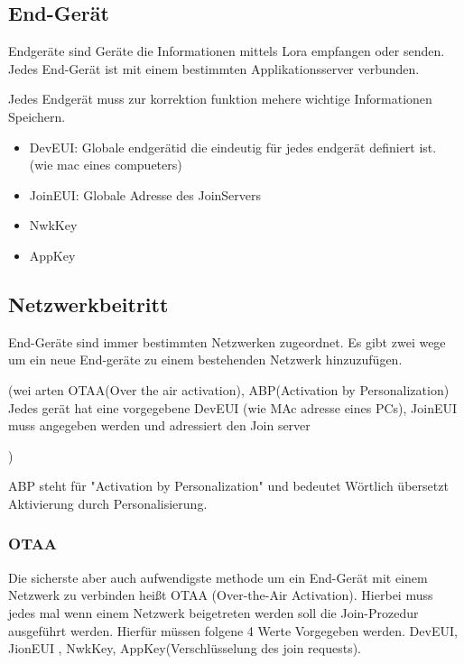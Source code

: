 \documentclass[a4paper,12pt]{article}
\begin{document}
        \subsection{End-Gerät}
            Endgeräte sind Geräte die Informationen mittels Lora empfangen oder senden. Jedes End-Gerät ist mit einem bestimmten Applikationsserver verbunden.
            

            Jedes Endgerät muss zur korrektion funktion mehere wichtige Informationen Speichern.
            \begin{itemize}
                \item DevEUI: Globale endgerätid die eindeutig für jedes endgerät definiert ist. (wie mac eines compueters)
                \item JoinEUI: Globale Adresse des JoinServers
                \item NwkKey
                \item AppKey
            \end{itemize}
        \subsection{Netzwerkbeitritt}
            End-Geräte sind immer bestimmten Netzwerken zugeordnet. Es gibt zwei wege um ein neue End-geräte zu einem bestehenden Netzwerk hinzuzufügen.

            \cite{LoRaSpec}(wei arten OTAA(Over the air activation), ABP(Activation by Personalization)
                    Jedes gerät hat eine vorgegebene DevEUI (wie MAc adresse eines PCs), JoinEUI muss angegeben werden und adressiert den Join server 
                    
            )
            
            
                ABP steht für "Activation by Personalization" und bedeutet Wörtlich übersetzt Aktivierung durch Personalisierung. 

            
            \subsubsection{OTAA}
            Die sicherste aber auch aufwendigste methode um ein End-Gerät mit einem Netzwerk zu verbinden heißt OTAA (Over-the-Air Activation). Hierbei muss jedes mal wenn einem Netzwerk beigetreten werden soll die Join-Prozedur ausgeführt werden.
            Hierfür müssen folgene 4 Werte Vorgegeben werden. DevEUI, JionEUI , NwkKey, AppKey(Verschlüsselung des join requests).
\end{document}

